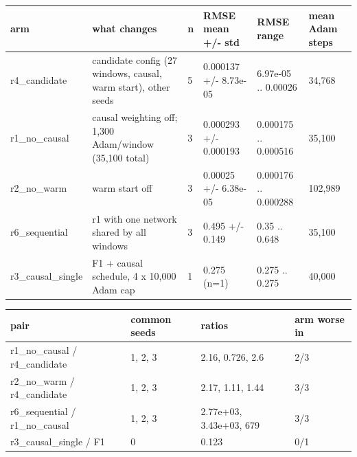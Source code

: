 \begin{table}[htbp]
\centering
\begin{tabular}{llllll}
\toprule
arm & what changes & n & RMSE mean +/- std & RMSE range & mean Adam steps \\
\midrule
r4\_candidate & candidate config (27 windows, causal, warm start), other seeds & 5 & 0.000137 +/- 8.73e-05 & 6.97e-05 .. 0.00026 & 34,768 \\
r1\_no\_causal & causal weighting off; 1,300 Adam/window (35,100 total) & 3 & 0.000293 +/- 0.000193 & 0.000175 .. 0.000516 & 35,100 \\
r2\_no\_warm & warm start off & 3 & 0.00025 +/- 6.38e-05 & 0.000176 .. 0.000288 & 102,989 \\
r6\_sequential & r1 with one network shared by all windows & 3 & 0.495 +/- 0.149 & 0.35 .. 0.648 & 35,100 \\
r3\_causal\_single & F1 + causal schedule, 4 x 10,000 Adam cap & 1 & 0.275 (n=1) & 0.275 .. 0.275 & 40,000 \\
\bottomrule
\end{tabular}
\end{table}

\begin{table}[htbp]
\centering
\begin{tabular}{llll}
\toprule
pair & common seeds & ratios & arm worse in \\
\midrule
r1\_no\_causal / r4\_candidate & 1, 2, 3 & 2.16, 0.726, 2.6 & 2/3 \\
r2\_no\_warm / r4\_candidate & 1, 2, 3 & 2.17, 1.11, 1.44 & 3/3 \\
r6\_sequential / r1\_no\_causal & 1, 2, 3 & 2.77e+03, 3.43e+03, 679 & 3/3 \\
r3\_causal\_single / F1 & 0 & 0.123 & 0/1 \\
\bottomrule
\end{tabular}
\end{table}


